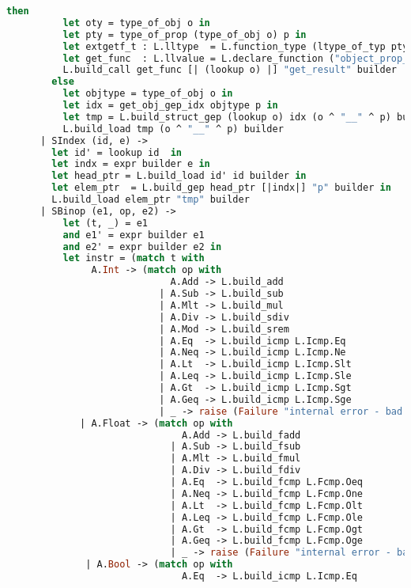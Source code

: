 \begin{lstlisting}[language=Caml,backgroundcolor=\color{backgroundcolor}]
        then
          let oty = type_of_obj o in
          let pty = type_of_prop (type_of_obj o) p in
          let extgetf_t : L.lltype  = L.function_type (ltype_of_typ pty) [| i32_t |] in
          let get_func  : L.llvalue = L.declare_function ("object_prop_get_" ^ oty ^ "_" ^ p) extgetf_t the_module in
          L.build_call get_func [| (lookup o) |] "get_result" builder
        else
          let objtype = type_of_obj o in
          let idx = get_obj_gep_idx objtype p in
          let tmp = L.build_struct_gep (lookup o) idx (o ^ "__" ^ p) builder in
          L.build_load tmp (o ^ "__" ^ p) builder
      | SIndex (id, e) ->
        let id' = lookup id  in
        let indx = expr builder e in
        let head_ptr = L.build_load id' id builder in
        let elem_ptr  = L.build_gep head_ptr [|indx|] "p" builder in
        L.build_load elem_ptr "tmp" builder
      | SBinop (e1, op, e2) ->
          let (t, _) = e1
          and e1' = expr builder e1
          and e2' = expr builder e2 in
          let instr = (match t with
               A.Int -> (match op with
                             A.Add -> L.build_add
                           | A.Sub -> L.build_sub
                           | A.Mlt -> L.build_mul
                           | A.Div -> L.build_sdiv
                           | A.Mod -> L.build_srem
                           | A.Eq  -> L.build_icmp L.Icmp.Eq
                           | A.Neq -> L.build_icmp L.Icmp.Ne
                           | A.Lt  -> L.build_icmp L.Icmp.Slt
                           | A.Leq -> L.build_icmp L.Icmp.Sle
                           | A.Gt  -> L.build_icmp L.Icmp.Sgt
                           | A.Geq -> L.build_icmp L.Icmp.Sge
                           | _ -> raise (Failure "internal error - bad int operator"))
             | A.Float -> (match op with
                               A.Add -> L.build_fadd
                             | A.Sub -> L.build_fsub
                             | A.Mlt -> L.build_fmul
                             | A.Div -> L.build_fdiv 
                             | A.Eq  -> L.build_fcmp L.Fcmp.Oeq
                             | A.Neq -> L.build_fcmp L.Fcmp.One
                             | A.Lt  -> L.build_fcmp L.Fcmp.Olt
                             | A.Leq -> L.build_fcmp L.Fcmp.Ole
                             | A.Gt  -> L.build_fcmp L.Fcmp.Ogt
                             | A.Geq -> L.build_fcmp L.Fcmp.Oge
                             | _ -> raise (Failure "internal error - bad float operator"))
              | A.Bool -> (match op with
                               A.Eq  -> L.build_icmp L.Icmp.Eq

\end{lstlisting}
